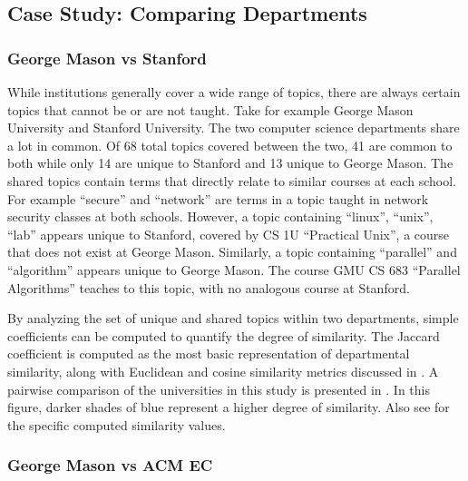 \subsection{Case Study: Comparing Departments}
\label{sec:eval-comparison}


\subsubsection{George Mason vs Stanford}
\label{sec:eval-comparison-stanford}


While institutions generally cover a wide range of topics, there are always certain topics that cannot be or are not taught.
Take for example George Mason University and Stanford University.
The two computer science departments share a lot in common.
Of 68 total topics covered between the two, 41 are common to both while only 14 are unique to Stanford and 13 unique to George Mason.
The shared topics contain terms that directly relate to similar courses at each school.
For example ``secure'' and ``network'' are terms in a topic taught in network security classes at both schools.
However, a topic containing ``linux'', ``unix'', ``lab'' appears unique to Stanford, covered by CS 1U ``Practical Unix'', a course that does not exist at George Mason.
Similarly, a topic containing ``parallel'' and ``algorithm'' appears unique to George Mason.
The course GMU CS 683 ``Parallel Algorithms'' teaches to this topic, with no analogous course at Stanford.


By analyzing the set of unique and shared topics within two departments, simple coefficients can be computed to quantify the degree of similarity.
The Jaccard coefficient is computed as the most basic representation of departmental similarity, along with Euclidean and cosine similarity metrics discussed in .
A pairwise comparison of the universities in this study is presented in .
In this figure, darker shades of blue represent a higher degree of similarity.
Also see  for the specific computed similarity values.


\subsubsection{George Mason vs ACM EC}
\label{sec:eval-comparison-acmec}

